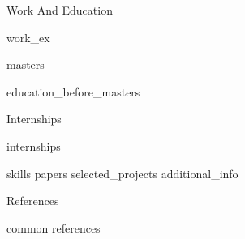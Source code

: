 \documentclass{resume} %
\begin{document}


\begin{rSection}{\faInstitution \hspace{0.5mm} Work And Education}

    {work_ex}
    
    {masters}
    
    {education_before_masters}

\end{rSection}


\begin{rSection}{\faBriefcase \hspace{0.5mm} Internships}

    {internships}

\end{rSection}


{skills}
{papers}
{selected_projects}
{additional_info}


\begin{rSection}{\faComments \hspace{0.5mm} References}

    \begin{enumerate}
        {common references}
    \end{enumerate}

\end{rSection}
\end{document}
